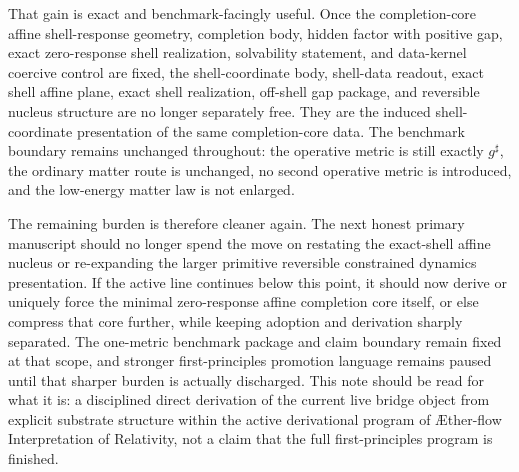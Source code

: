 \documentclass[11pt]{article}
\newcommand{\Aflow}{\AE{}ther-flow}
\newcommand{\TheoryName}{\Aflow{} Interpretation of Relativity}
\newcommand{\CompletedMetric}{g^{\sharp}}
\begin{document}
That gain is exact and benchmark-facingly useful. Once the completion-core affine shell-response geometry, completion body, hidden factor with positive gap, exact zero-response shell realization, solvability statement, and data-kernel coercive control are fixed, the shell-coordinate body, shell-data readout, exact shell affine plane, exact shell realization, off-shell gap package, and reversible nucleus structure are no longer separately free. They are the induced shell-coordinate presentation of the same completion-core data. The benchmark boundary remains unchanged throughout: the operative metric is still exactly \(\CompletedMetric\), the ordinary matter route is unchanged, no second operative metric is introduced, and the low-energy matter law is not enlarged.

The remaining burden is therefore cleaner again. The next honest primary manuscript should no longer spend the move on restating the exact-shell affine nucleus or re-expanding the larger primitive reversible constrained dynamics presentation. If the active line continues below this point, it should now derive or uniquely force the minimal zero-response affine completion core itself, or else compress that core further, while keeping adoption and derivation sharply separated. The one-metric benchmark package and claim boundary remain fixed at that scope, and stronger first-principles promotion language remains paused until that sharper burden is actually discharged. This note should be read for what it is: a disciplined direct derivation of the current live bridge object from explicit substrate structure within the active derivational program of \TheoryName{}, not a claim that the full first-principles program is finished.
\end{document}
